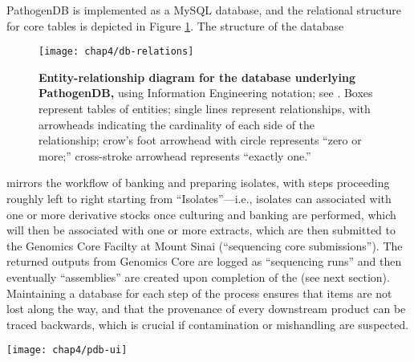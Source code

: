 PathogenDB is implemented as a MySQL database, and the relational structure for core tables is depicted in Figure \ref{fig:pdb_relations}. The structure of the database 
\begin{figure}[htb]
  \texttt{[image: chap4/db-relations]}               
  \caption[Entity-relationship diagram for the database underlying PathogenDB]{\textbf{Entity-relationship diagram for the database underlying PathogenDB,} using Information Engineering notation; see \textcite{Halpin2010}. Boxes represent tables of entities; single lines represent relationships, with arrowheads indicating the cardinality of each side of the relationship; crow’s foot arrowhead with circle represents “zero or more;” cross-stroke arrowhead represents “exactly one.”}
  \label{fig:pdb_relations}
\end{figure}
mirrors the workflow of banking and preparing isolates, with steps proceeding roughly left to right starting from ``Isolates''—i.e., isolates can associated with one or more derivative stocks once culturing and banking are performed, which will then be associated with one or more extracts, which are then submitted to the Genomics Core Facilty at Mount Sinai (``sequencing core submissions''). The returned outputs from Genomics Core are logged as ``sequencing runs'' and then eventually ``assemblies'' are created upon completion of the \pathogendbpipeline{} (see next section). Maintaining a database for each step of the process ensures that items are not lost along the way, and that the provenance of every downstream product can be traced backwards, which is crucial if contamination or mishandling are suspected.

\begin{sidewaysfigure}[hp]
  \sidewaysvspace
  \centering
  \texttt{[image: chap4/pdb-ui]}               
\end{sidewaysfigure}

